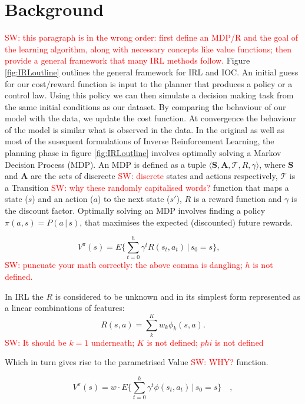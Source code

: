 \documentclass[letterpaper]{article}
\newcommand{\sw}[1]{\textcolor{red}{SW: #1}}
\begin{document}
\section{Background}
\sw{this paragraph is in the wrong order: first define an MDP/R and the goal of the learning algorithm, along with necessary concepts like value functions; then provide a general framework that many IRL methods follow.}
Figure \ref{fig:IRLoutline} outlines the general framework for IRL and IOC. An initial guess for our cost/reward function is input to the planner that produces a policy or a control law. Using this policy we can then simulate a decision making task from the same initial conditions as our dataset. By comparing the behaviour of our model with the data, we update the cost function. At convergence the behaviour of the model is similar what is observed in the data.
In the original as well as most of the susequent formulations of Inverse Reinforcement Learning, the planning phase in figure \ref{fig:IRLoutline} involves optimally solving a Markov Decision Process (MDP). An MDP is defined as a tuple $\langle\mathbf{S},\mathbf{A},\mathcal{T},R,\gamma\rangle$, where $\mathbf{S}$ and $\mathbf{A}$ are the sets of discreete \sw{discrete} states and actions respectively, $\mathcal{T}$ is a Transition \sw{why these randomly capitalised words?} function that maps a state ($s$) and an action ($a$) to the next state ($s'$), $R$ is a reward function and $\gamma$ is the discount factor. 
Optimally solving an MDP involves finding a policy $\pi(a,s) = P(a\,|\,s)$, that maximises the expected (discounted) future rewards.

\begin{equation}
 V^\pi(s) = E\{\sum_{t = 0}^h \gamma^tR(s_t,a_t)\,\vert\, s_0 = s\},\quad
\end{equation}
\sw{puncuate your math correctly: the above comma is dangling; $h$ is not defined.}

In IRL the $R$ is considered to be unknown and in its simplest form represented as a linear combinations of features:
\begin{equation}
R(s,a) = \sum_k^Kw_k\phi_k(s,a). \label{eq:rew}
\end{equation}
\sw{It should be $k=1$ underneath; $K$ is not defined; $phi$ is not defined}

Which in turn gives rise to the parametrised Value \sw{WHY?} function.

\begin{equation}
 	V^\pi(s) = w \cdot E\{\sum_{t = 0}^h \gamma^t\phi(s_t,a_t)\,\vert\, s_0 = s\}\quad,
\end{equation}
\end{document}

